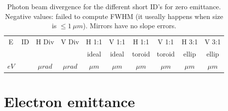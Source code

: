 \documentclass[a4paper,10pt]{article}
\begin{document}
\begin{table}[H]
\label{tabledivergenceszeroemittance}
\caption{Photon beam divergence for the different short ID's for zero emittance. 
Negative values: failed to compute FWHM (it useally happens when size is $\leq 1~\mu m$).
Mirrors have no slope errors. }
\vspace{0.3cm}
\begin{tabular}{cc|cc|cc|cc|cc}      %
\hline
E       & ID  & H Div     &  V Div     & H 1:1            &  V 1:1   & H 1:1    &  V 1:1   & H 3:1     &  V 3:1      \\
        &     &           &            & ideal            &  ideal   & toroid   &  toroid  & ellip     &  ellip  \\
$eV$    &     & $\mu rad$ &  $\mu rad$ & $\mu m$          &  $\mu m$ & $\mu m$  &  $\mu m$ & $\mu m$   &  $\mu m$\\
\hline

\hline
\end{tabular}
\end{table}

\section{Electron emittance}
\end{document}
